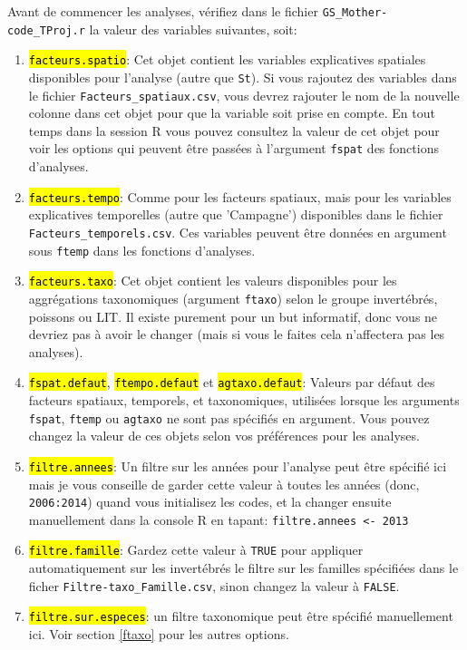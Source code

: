 \documentclass{article}
\begin{document}
Avant de commencer les analyses, vérifiez dans le fichier
\texttt{GS\_Mother-code\_TProj.r} la valeur des variables suivantes,
soit:
\begin{enumerate}
\item \hl{\texttt{facteurs.spatio}}: Cet objet contient les variables
  explicatives spatiales disponibles pour l'analyse (autre que
  \texttt{St}). Si vous rajoutez des variables dans le fichier
  \texttt{Facteurs\_spatiaux.csv}, vous devrez rajouter le nom de la
  nouvelle colonne dans cet objet pour que la variable soit prise en
  compte. En tout temps dans la session R vous pouvez consultez la
  valeur de cet objet pour voir les options qui peuvent être passées à
  l'argument \texttt{fspat} des fonctions d'analyses.
\item \hl{\texttt{facteurs.tempo}}: Comme pour les facteurs spatiaux,
  mais pour les variables explicatives temporelles (autre que
  'Campagne') disponibles dans le fichier
  \texttt{Facteurs\_temporels.csv}. Ces variables peuvent être données
  en argument sous \texttt{ftemp} dans les fonctions d'analyses.
\item \hl{\texttt{facteurs.taxo}}: Cet objet contient les valeurs
  disponibles pour les aggrégations taxonomiques (argument
  \texttt{ftaxo}) selon le groupe invertébrés, poissons ou LIT. Il
  existe purement pour un but
  informatif, donc vous ne devriez pas à avoir le changer (mais si
  vous le faites cela n'affectera pas les analyses).
\item \hl{\texttt{fspat.defaut}}, \hl{\texttt{ftempo.defaut}} et
  \hl{\texttt{agtaxo.defaut}}: Valeurs par défaut des facteurs
  spatiaux, temporels, et taxonomiques, utilisées lorsque les
  arguments \texttt{fspat}, \texttt{ftemp} ou \texttt{agtaxo} ne sont
  pas spécifiés en argument. Vous pouvez changez la valeur de ces
  objets selon vos préférences pour les analyses.
\item \hl{\texttt{filtre.annees}}: Un filtre sur les années pour
  l'analyse peut être spécifié ici mais je vous conseille de garder
  cette valeur à toutes les années (donc, \texttt{2006:2014}) quand vous
  initialisez les codes, et la changer ensuite manuellement dans la
  console R en tapant: \texttt{filtre.annees <- 2013}

\item \hl{\texttt{filtre.famille}}: Gardez cette valeur à
  \texttt{TRUE} pour appliquer automatiquement sur les invertébrés le
  filtre sur les familles spécifiées dans le ficher
  \texttt{Filtre-taxo\_Famille.csv}, sinon changez la valeur à
  \texttt{FALSE}.

\item \hl{\texttt{filtre.sur.especes}}: un filtre taxonomique peut
  être spécifié manuellement ici. Voir section \ref{ftaxo} pour les
  autres options.
\end{enumerate}
\end{document}
